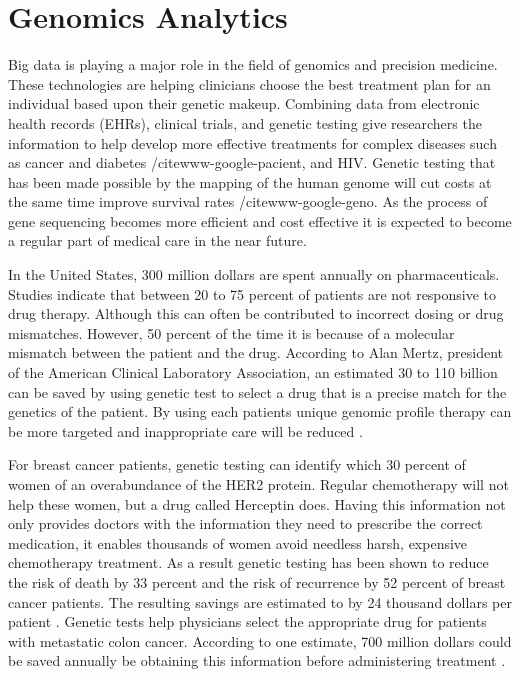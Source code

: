 \documentclass[sigconf]{acmart}
\begin{document}
{\section{Genomics Analytics}
Big data is playing a major role in the field of genomics and precision medicine. These technologies are helping clinicians choose the best treatment plan for an individual based upon their genetic makeup. Combining data from electronic health records (EHRs), clinical trials, and genetic testing give researchers the information to help develop more effective treatments for complex diseases such as cancer and diabetes /cite{www-google-pacient}, and HIV.  Genetic testing that has been made possible by the mapping of the human genome will cut costs at the same time improve survival rates /cite{www-google-geno}. As the process of gene sequencing becomes more efficient and cost effective it is expected to become a regular part of medical care in the near future.

In the United States, 300 million dollars are spent annually on pharmaceuticals. Studies indicate that between 20 to 75 percent of patients are not responsive to drug therapy. Although this can often be contributed to incorrect dosing or drug mismatches. However, 50 percent of the time it is because of a molecular mismatch between the patient and the drug. According to Alan Mertz, president of the American Clinical Laboratory Association, an estimated 30 to 110 billion can be saved by using genetic test to select a drug that is a precise match for the genetics of the patient. By using each patients unique genomic profile therapy can be more targeted and inappropriate care will be reduced \cite{www-google-geno}.

For breast cancer patients, genetic testing can identify which 30 percent of women of an overabundance of the HER2 protein. Regular chemotherapy will not help these women, but a drug called Herceptin does. Having this information not only provides doctors with the information they need to prescribe the correct medication, it enables thousands of women avoid needless harsh, expensive chemotherapy treatment.  As a result genetic testing has been shown to reduce the risk of death by 33 percent and the risk of recurrence by 52 percent of breast cancer patients. The resulting savings are estimated to by 24 thousand dollars per patient \cite{www-google-geno}.
Genetic tests help physicians select the appropriate drug for patients with metastatic colon cancer. According to one estimate, 700 million dollars could be saved annually be obtaining this information before administering treatment \cite{www-google-geno}.

}
\end{document}
